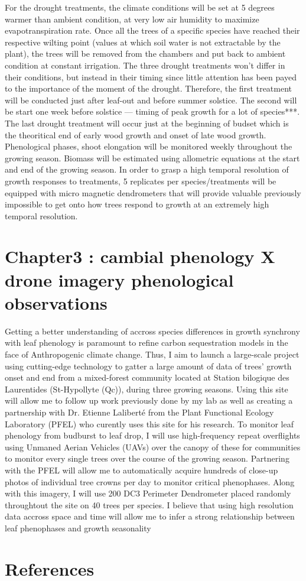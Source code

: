 \documentclass{article}
\begin{document}
For the drought treatments, the climate conditions will be set at 5 degrees warmer than ambient condition, at very low air humidity to maximize evapotranspiration rate. Once all the trees of a specific species have reached their respective wilting point (values at which soil water is not extractable by the plant), the trees will be removed from the chambers and put back to ambient condition at constant irrigation. The three drought treatments won't differ in their conditions, but instead in their timing since little attention has been payed to the importance of the moment of the drought. Therefore, the first treatment will be conducted just after leaf-out and before summer solstice. The second will be start one week before solstice --- timing of peak growth for a lot of species***. The last drought treatment will occur just at the beginning of budset which is the theoritical end of early wood growth and onset of late wood growth. Phenological phases, shoot elongation will be monitored weekly throughout the growing season. Biomass will be estimated using allometric equations at the start and end of the growing season. In order to grasp a high temporal resolution of growth responses to treatments, 5 replicates per species/treatments will be equipped with micro magnetic dendrometers that will provide valuable previously impossible to get onto how trees respond to growth at an extremely high temporal resolution. 

\section*{Chapter3 : cambial phenology X drone imagery phenological observations}
Getting a better understanding of accross species differences in growth synchrony with leaf phenology is paramount to refine carbon sequestration models in the face of Anthropogenic climate change. Thus, I aim to launch a large-scale project using cutting-edge technology to gatter a large amount of data of trees' growth onset and end from a mixed-forest community located at Station bilogique des Laurentides (St-Hypollyte (Qc)), during three growing seasons. Using this site will allow me to follow up work previously done by my lab as well as creating a partnership with Dr. Etienne Laliberté from the Plant Functional Ecology Laboratory (PFEL) who curently uses this site for his research. To monitor leaf phenology from budburst to leaf drop, I will use high-frequency repeat overflights using Unmaned Aerian Vehicles (UAVs) over the canopy of these for communities to monitor every single trees over the course of the growing season. Partnering with the PFEL will allow me to automatically acquire hundreds of close-up photos of individual tree crowns per day to monitor critical phenophases. Along with this imagery, I will use 200 DC3 Perimeter Dendrometer placed randomly throughtout the site on 40 trees per species. I believe that using high resolution data accross space and time will allow me to infer a strong relationship between leaf phenophases and growth seasonality

\section{References}

\end{document}
